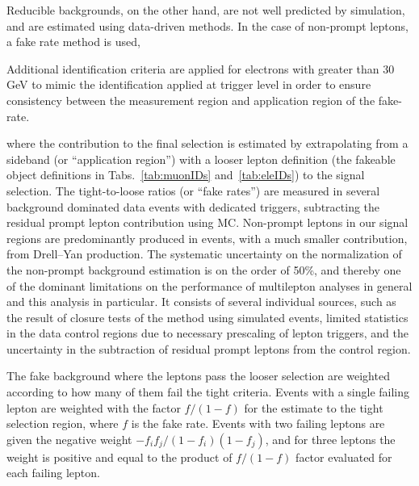 Reducible backgrounds, on the other hand, are not well predicted by simulation, and are estimated using data-driven methods. In the case of non-prompt leptons, a fake rate method is used,






 Additional identification criteria are applied for electrons with \pt greater than 30 GeV to mimic the identification applied at trigger level in order to ensure consistency between the measurement region and application region of the fake-rate.









where the contribution to the final selection is estimated by extrapolating from a sideband (or ``application region'') with a looser lepton definition (the fakeable object definitions in Tabs.~\ref{tab:muonIDs} and~\ref{tab:eleIDs}) to the signal selection. The tight-to-loose ratios (or ``fake rates'') are measured in several background dominated data events with dedicated triggers, subtracting the residual prompt lepton contribution using MC. Non-prompt leptons in our signal regions are predominantly produced in \ttbar events, with a much smaller contribution, from Drell--Yan production. The systematic uncertainty on the normalization of the non-prompt background estimation is on the order of 50\%, and thereby one of the dominant limitations on the performance of multilepton analyses in general and this analysis in particular. It consists of several individual sources, such as the result of closure tests of the method using simulated events, limited statistics in the data control regions due to necessary prescaling of lepton triggers, and the uncertainty in the subtraction of residual prompt leptons from the control region.

The fake background where the leptons pass the looser selection are weighted according to how many of them fail the tight criteria. Events with a single failing lepton are weighted with the factor $f/(1-f)$ for the estimate to the tight selection region, where $f$ is the fake rate. Events with two failing leptons are given the negative weight $-f_{i}f_{j}/(1-f_{i})(1-f_{j})$, and for three leptons the weight is positive and equal to the product of $f/(1-f)$ factor evaluated for each failing lepton.


